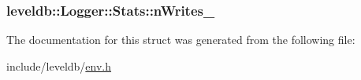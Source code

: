 \subsubsection[{n\+Writes\+\_\+}]{ leveldb\+::\+Logger\+::\+Stats\+::n\+Writes\+\_\+}\label{structleveldb_1_1_logger_1_1_stats_aba97a29c974715b24e19001fcc87262e}


The documentation for this struct was generated from the following file\+:\begin{DoxyCompactItemize}
\item 
include/leveldb/\hyperlink{env_8h}{env.\+h}\end{DoxyCompactItemize}
